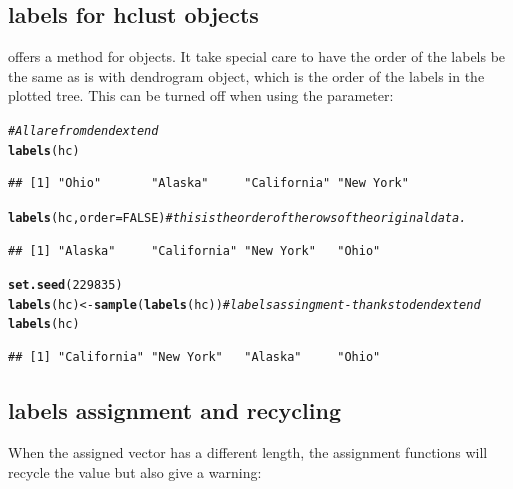 \documentclass[shortnames,nojss,article]{jss}\usepackage[]{graphicx}\usepackage[]{color}
\makeatletter
\newcommand{\hlnum}[1]{\textcolor[rgb]{0.686,0.059,0.569}{#1}}%
\newcommand{\hlcom}[1]{\textcolor[rgb]{0.678,0.584,0.686}{\textit{#1}}}%
\newcommand{\hlstd}[1]{\textcolor[rgb]{0.345,0.345,0.345}{#1}}%
\newcommand{\hlkwb}[1]{\textcolor[rgb]{0.69,0.353,0.396}{#1}}%
\newcommand{\hlkwc}[1]{\textcolor[rgb]{0.333,0.667,0.333}{#1}}%
\newcommand{\hlkwd}[1]{\textcolor[rgb]{0.737,0.353,0.396}{\textbf{#1}}}%
\newenvironment{kframe}{%
 \def\at@end@of@kframe{}%
 \ifinner\ifhmode%
  \def\at@end@of@kframe{\end{minipage}}%
  \begin{minipage}{\columnwidth}%
 \fi\fi%
 \def\FrameCommand##1{\hskip\@totalleftmargin \hskip-\fboxsep
 \colorbox{shadecolor}{##1}\hskip-\fboxsep
     \hskip-\linewidth \hskip-\@totalleftmargin \hskip\columnwidth}%
 \MakeFramed {\advance\hsize-\width
   \@totalleftmargin\z@ \linewidth\hsize
   \@setminipage}}%
 {\par\unskip\endMakeFramed%
 \at@end@of@kframe}
\newenvironment{knitrout}{}{} %
\makeatother
\begin{document}
\subsection{labels for hclust objects}

 offers a  method for  objects. It take special care to have the order of the labels be the same as is with dendrogram object, which is the order of the labels in the plotted tree. This can be turned off when using the  parameter:

\begin{knitrout}
\color{fgcolor}\begin{kframe}
\begin{alltt}
\hlcom{# All are from dendextend}
\hlkwd{labels}\hlstd{(hc)}
\end{alltt}
\begin{verbatim}
## [1] "Ohio"       "Alaska"     "California" "New York"
\end{verbatim}
\begin{alltt}
\hlkwd{labels}\hlstd{(hc,} \hlkwc{order} \hlstd{=} \hlnum{FALSE}\hlstd{)}  \hlcom{# this is the order of the rows of the original data.}
\end{alltt}
\begin{verbatim}
## [1] "Alaska"     "California" "New York"   "Ohio"
\end{verbatim}
\begin{alltt}
\hlkwd{set.seed}\hlstd{(}\hlnum{229835}\hlstd{)}
\hlkwd{labels}\hlstd{(hc)} \hlkwb{<-} \hlkwd{sample}\hlstd{(}\hlkwd{labels}\hlstd{(hc))}  \hlcom{# labels assingment - thanks to dendextend}
\hlkwd{labels}\hlstd{(hc)}
\end{alltt}
\begin{verbatim}
## [1] "California" "New York"   "Alaska"     "Ohio"
\end{verbatim}
\end{kframe}
\end{knitrout}



\subsection{labels assignment and recycling}

When the assigned vector has a different length, the  assignment functions will recycle the value but also give a warning:
\end{document}
